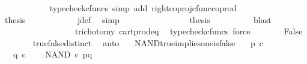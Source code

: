 \begin{isabellebody}
\ \ \ \ \ \ \ \ \ \ \isamarkupfalse%
\ {\isacharparenleft}{\kern0pt}typecheck{\isacharunderscore}{\kern0pt}cfuncs{\isacharcomma}{\kern0pt}\ simp\ add{\isacharcolon}{\kern0pt}\ right{\isacharunderscore}{\kern0pt}coproj{\isacharunderscore}{\kern0pt}cfunc{\isacharunderscore}{\kern0pt}coprod{\isacharparenright}{\kern0pt}\isanewline
\ \ \ \ \ \ \ \ \isamarkupfalse%
\ \isamarkupfalse%
\ {\isacharquery}{\kern0pt}thesis\isanewline
\ \ \ \ \ \ \ \ \ \ \isamarkupfalse%
\ j{\isacharunderscore}{\kern0pt}def\ \isamarkupfalse%
\ simp\isanewline
\ \ \ \ \ \ \isamarkupfalse%
\isanewline
\ \ \ \ \ \ \isamarkupfalse%
\ \isamarkupfalse%
\ {\isacharquery}{\kern0pt}thesis\isanewline
\ \ \ \ \ \ \ \ \isamarkupfalse%
\ blast\isanewline
\ \ \ \ \isamarkupfalse%
\isanewline
\ \ \isamarkupfalse%
\isanewline
\ \ \ \ \isamarkupfalse%
\ \isamarkupfalse%
\ {\isachardoublequoteopen}{\isasymt}\ {\isacharequal}{\kern0pt}\ {\isasymf}{\isachardoublequoteclose}\isanewline
\ \ \ \ \ \ \isamarkupfalse%
\ trichotomy\ cart{\isacharunderscore}{\kern0pt}prod{\isacharunderscore}{\kern0pt}eq{}\ \isamarkupfalse%
\ {\isacharparenleft}{\kern0pt}typecheck{\isacharunderscore}{\kern0pt}cfuncs{\isacharcomma}{\kern0pt}\ force{\isacharparenright}{\kern0pt}\isanewline
\ \ \ \ \isamarkupfalse%
\ \isamarkupfalse%
\ False\isanewline
\ \ \ \ \ \ \isamarkupfalse%
\ true{\isacharunderscore}{\kern0pt}false{\isacharunderscore}{\kern0pt}distinct\ \isamarkupfalse%
\ auto\ \ \isanewline
{}\isamarkupfalse%
%
\endisatagproof
{\isafoldproof}%
%
\isadelimproof
\isanewline
%
\endisadelimproof
\isanewline
{}\isamarkupfalse%
\ NAND{\isacharunderscore}{\kern0pt}true{\isacharunderscore}{\kern0pt}implies{\isacharunderscore}{\kern0pt}one{\isacharunderscore}{\kern0pt}is{\isacharunderscore}{\kern0pt}false{\isacharcolon}{\kern0pt}\isanewline
\ \ \ {\isachardoublequoteopen}p\ {\isasymin}\isactrlsub c\ {\isasymOmega}{\isachardoublequoteclose}\ \isanewline
\ \ \ {\isachardoublequoteopen}q\ {\isasymin}\isactrlsub c\ {\isasymOmega}{\isachardoublequoteclose}\isanewline
\ \ \ {\isachardoublequoteopen}NAND\ {\isasymcirc}\isactrlsub c\ {\isasymlangle}p{\isacharcomma}{\kern0pt}q{\isasymrangle}\ {\isacharequal}{\kern0pt}\ {\isasymt}{\isachardoublequoteclose}\isanewline

\end{isabellebody}
